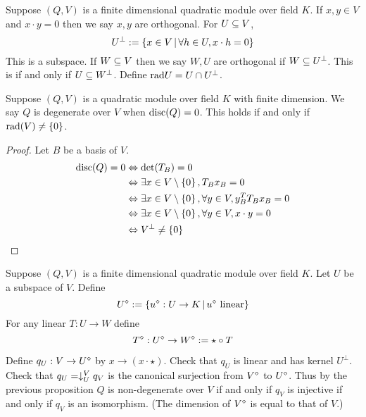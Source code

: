 \begin{dfn}
    Suppose $(Q,V)$ is a finite dimensional 
    quadratic module over field $K$. 
    If $x,y \in V$ and $x \cdot y = 0$ then we say $x,y$ are orthogonal.
    For $U \subseteq V$, 
    \[U^\bot := \{x \in V \,|\, \forall h \in U, x \cdot h = 0\}\]
    This is a subspace.
    If $W \subseteq V$ then we say $W,U$ are orthogonal if $W \subseteq U^\bot$.
    This is if and only if $U \subseteq W^\bot$.
    Define $\mathrm{rad }{U} = U \cap U^\bot$.
\end{dfn}

\begin{prop}[Degenerate $Q$]
    Suppose $(Q,V)$ is a quadratic module over field $K$
    with finite dimension.
    We say $Q$ is degenerate over $V$ when $\mathrm{disc}(Q) = 0$.
    This holds if and only if $\mathrm{rad }(V) \ne \left\{0\right\}$.
\end{prop}
\begin{proof}
    Let $B$ be a basis of $V$.
    \begin{align*}
        \mathrm{disc}(Q) = 0 &\Leftrightarrow \det (T_B) = 0 \\
        &\Leftrightarrow \exists x \in V \setminus \left\{0\right\}, T_B x_B = 0\\
        &\Leftrightarrow \exists x \in V \setminus \left\{0\right\}, 
        \forall y \in V, y_B^T T_B x_B = 0\\
        &\Leftrightarrow \exists x \in V \setminus \left\{0\right\}, 
        \forall y \in V, x \cdot y = 0\\
        &\Leftrightarrow V^\bot \ne \left\{0\right\}
    \end{align*}
\end{proof}
\begin{dfn}
    Suppose $(Q,V)$ is a finite dimensional 
    quadratic module over field $K$.
    Let $U$ be a subspace of $V$.
    Define 
    \[U^\diamond := \left\{u^\diamond : U \to K \,|\, 
    u^\diamond\text{ linear}\right\}\]
    For any linear $T : U \to W$ define 
    \[T^\diamond : U^\diamond \to W^\diamond : = \star \circ T\]

    Define $q_U : V \to U^\diamond$ by $x \to (x \cdot \star)$.
    Check that $q_U$ is linear and has kernel $U^\bot$.
    Check that $q_U = \downarrow_{U}^{V} q_V$ is the canonical surjection
    from $V^\diamond$ to $U^\diamond$.
    Thus by the previous proposition 
    $Q$ is non-degenerate over $V$ if and only if $q_V$ is injective
    if and only if $q_V$ is an isomorphism.
    (The dimension of $V^\diamond$ is equal to that of $V$.)
\end{dfn}

